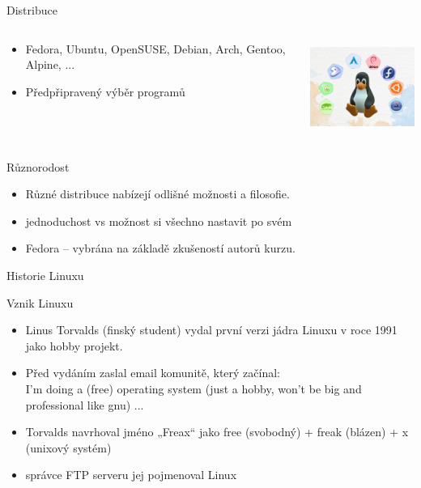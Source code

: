 \documentclass{beamer}
\begin{document}
\begin{frame}{Distribuce}
  \begin{columns}
	\begin{column}{0.6\textwidth}
		\begin{itemize}
			\item Fedora, Ubuntu, OpenSUSE, Debian, Arch, Gentoo, Alpine, ...
			\item Předpřipravený výběr programů
		\end{itemize}
	\end{column}
	\begin{column}{0.4\textwidth}
		\includegraphics[height=3cm]{Linux_distro_logos_and_Tux.png}
	\end{column}
\end{columns}

	\begin{block}{Různorodost}
		\begin{itemize}
			\item Různé distribuce nabízejí odlišné možnosti a filosofie.
			\item  jednoduchost vs možnost si všechno nastavit po svém
			\item Fedora -- vybrána na základě zkušeností autorů kurzu.
		\end{itemize}
	\end{block}
\end{frame}



\begin{frame}{Historie Linuxu}
	\begin{block}{Vznik Linuxu}
		\begin{itemize}
			\item Linus Torvalds (finský student) vydal první verzi jádra Linuxu v roce 1991 jako hobby projekt.
			\item Před vydáním zaslal email komunitě, který začínal: \\
			I'm doing a (free) operating system (just a hobby, won't be big and professional like gnu) ...
			\item Torvalds navrhoval jméno „Freax“ jako free (svobodný) + freak (blázen) + x (unixový systém)
			\item správce FTP serveru jej pojmenoval Linux


		\end{itemize}
	\end{block}
\end{frame}
\end{document}
